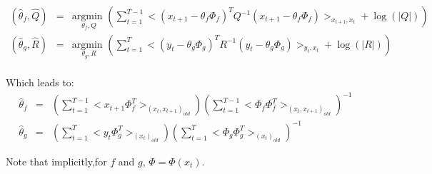 \begin{eqnarray}
(\hat{\theta}_f,\hat{Q})&=&\underset{\theta_f,Q}{\text{argmin }}{\left(\sum_{t=1}^{T-1}{
<(x_{t+1}-\theta_f\Phi_f)^T Q^{-1}(x_{t+1}-\theta_f\Phi_f) >_{x_{t+1},x_t}+\log(|Q|)
}\right)}\nonumber\\
(\hat{\theta}_g,\hat{R})&=&\underset{\theta_g,R}{\text{argmin }}{\left(\sum_{t=1}^{T}{
<(y_{t}-\theta_g\Phi_g)^T R^{-1}(y_{t}-\theta_g\Phi_g) >_{y_t,x_t}+\log(|R|)
}\right)}\nonumber\\
\end{eqnarray}

Which leads to:
\begin{eqnarray}
\hat{\theta}_f&=&(\sum_{t=1}^{T-1}{<x_{t+1}\Phi_f^T >_{(x_t,x_{t+1})_{old}}})(\sum_{t=1}^{T-1}{<\Phi_f\Phi_f^T >_{(x_t,x_{t+1})_{old}}})^{-1}\\
\hat{\theta}_g&=&(\sum_{t=1}^{T}{<y_{t}\Phi_g^T >_{(x_t)_{old}}})(\sum_{t=1}^{T}{<\Phi_g\Phi_g^T >_{(x_t)_{old}}})^{-1}
\end{eqnarray}

Note that implicitly,for $f$ and $g$, $\Phi=\Phi(x_t)$.

